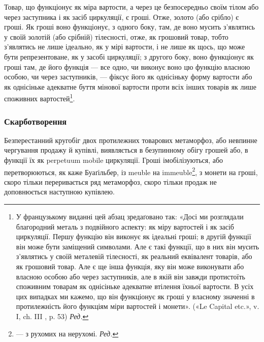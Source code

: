 Товар, що функціонує як міра вартости, а через це безпосередньо
своїм тілом або через заступника і як засіб циркуляції,
є гроші. Отже, золото (або срібло) є гроші. Як гроші воно функціонує,
з одного боку, там, де воно мусить з’являтись у своїй
золотій (або срібній) тілесності, отже, як грошовий товар, тобто
з’являтись не лише ідеально, як у мірі вартости, і не лише як
щось, що може бути репрезентоване, як у засобі циркуляції;
з другого боку, воно функціонує як гроші там, де його функція —
все одно, чи виконує воно цю функцію власною особою, чи через
заступників, — фіксує його як однісіньку форму вартости або як
однісіньке адекватне буття мінової вартости проти всіх інших
товарів як лише споживних вартостей\footnote*{
У французькому виданні цей абзац зредаґовано так: «Досі ми розглядали
благородний металь з подвійного аспекту: як міру вартостей і як засіб циркуляції.
Першу функцію він виконує як ідеальні гроші;
в другій функції він може бути заміщений символами. Але є такі функції,
що в них він мусить з’являтись у своїй металевій тілесності, як реальний
еквівалент товарів, або як грошовий товар. Але є ще інша функція, яку він
може виконувати або власною особою або через заступників, але в якій
він завжди протистоїть споживним товарам як однісіньке адекватне
втілення їхньої вартости. В усіх цих випадках ми кажемо, що він функціонує
як гроші у власному значенні в протилежність його функціям міри
вартостей і монети». («Le Capital etc.», v. I, ch. III , p. 53) \emph{Ред.}
}.

\subsubsection{Скарботворення}

Безперестанний кругобіг двох протилежних товарових метаморфоз,
або невпинне чергування продажу й купівлі, виявляється
в безупинному обігу грошей або, в функції їх як perpetuum mobile
циркуляції. Гроші імобілізуються, або перетворюються, як
каже Буаґільбер, із meuble на immeuble\footnote*{
— з рухомих на нерухомі. \emph{Ред.}
}, з монети на гроші,
скоро тільки переривається ряд метаморфоз, скоро тільки продаж
не доповнюється наступною купівлею.

